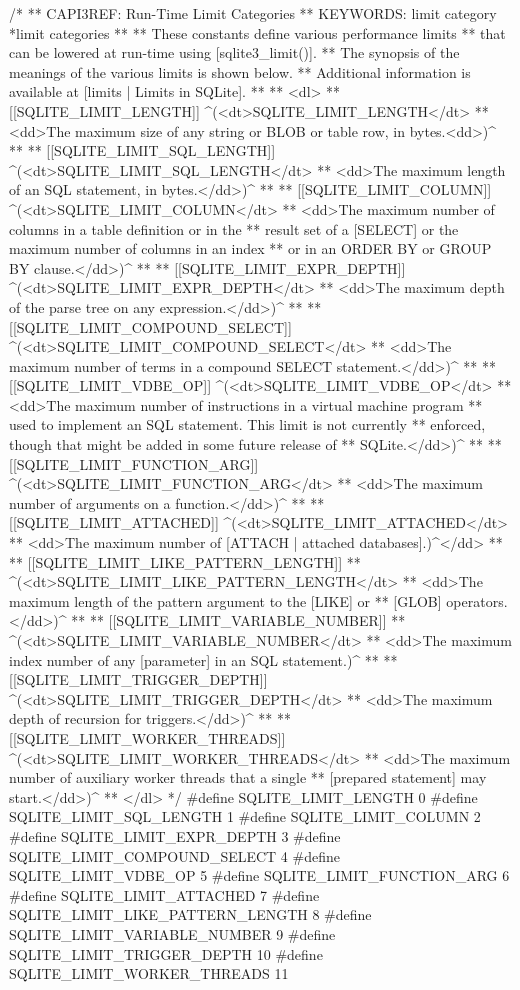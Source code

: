 \begin{Codex}[label=sqlite3.h,numbers=left]
{/*
** CAPI3REF: Run-Time Limit Categories
** KEYWORDS: {limit category} {*limit categories}
**
** These constants define various performance limits
** that can be lowered at run-time using [sqlite3_limit()].
** The synopsis of the meanings of the various limits is shown below.
** Additional information is available at [limits | Limits in SQLite].
**
** <dl>
** [[SQLITE_LIMIT_LENGTH]] ^(<dt>SQLITE_LIMIT_LENGTH</dt>
** <dd>The maximum size of any string or BLOB or table row, in bytes.<dd>)^
**
** [[SQLITE_LIMIT_SQL_LENGTH]] ^(<dt>SQLITE_LIMIT_SQL_LENGTH</dt>
** <dd>The maximum length of an SQL statement, in bytes.</dd>)^
**
** [[SQLITE_LIMIT_COLUMN]] ^(<dt>SQLITE_LIMIT_COLUMN</dt>
** <dd>The maximum number of columns in a table definition or in the
** result set of a [SELECT] or the maximum number of columns in an index
** or in an ORDER BY or GROUP BY clause.</dd>)^
**
** [[SQLITE_LIMIT_EXPR_DEPTH]] ^(<dt>SQLITE_LIMIT_EXPR_DEPTH</dt>
** <dd>The maximum depth of the parse tree on any expression.</dd>)^
**
** [[SQLITE_LIMIT_COMPOUND_SELECT]] ^(<dt>SQLITE_LIMIT_COMPOUND_SELECT</dt>
** <dd>The maximum number of terms in a compound SELECT statement.</dd>)^
**
** [[SQLITE_LIMIT_VDBE_OP]] ^(<dt>SQLITE_LIMIT_VDBE_OP</dt>
** <dd>The maximum number of instructions in a virtual machine program
** used to implement an SQL statement.  This limit is not currently
** enforced, though that might be added in some future release of
** SQLite.</dd>)^
**
** [[SQLITE_LIMIT_FUNCTION_ARG]] ^(<dt>SQLITE_LIMIT_FUNCTION_ARG</dt>
** <dd>The maximum number of arguments on a function.</dd>)^
**
** [[SQLITE_LIMIT_ATTACHED]] ^(<dt>SQLITE_LIMIT_ATTACHED</dt>
** <dd>The maximum number of [ATTACH | attached databases].)^</dd>
**
** [[SQLITE_LIMIT_LIKE_PATTERN_LENGTH]]
** ^(<dt>SQLITE_LIMIT_LIKE_PATTERN_LENGTH</dt>
** <dd>The maximum length of the pattern argument to the [LIKE] or
** [GLOB] operators.</dd>)^
**
** [[SQLITE_LIMIT_VARIABLE_NUMBER]]
** ^(<dt>SQLITE_LIMIT_VARIABLE_NUMBER</dt>
** <dd>The maximum index number of any [parameter] in an SQL statement.)^
**
** [[SQLITE_LIMIT_TRIGGER_DEPTH]] ^(<dt>SQLITE_LIMIT_TRIGGER_DEPTH</dt>
** <dd>The maximum depth of recursion for triggers.</dd>)^
**
** [[SQLITE_LIMIT_WORKER_THREADS]] ^(<dt>SQLITE_LIMIT_WORKER_THREADS</dt>
** <dd>The maximum number of auxiliary worker threads that a single
** [prepared statement] may start.</dd>)^
** </dl>
*/
#define SQLITE_LIMIT_LENGTH                    0
#define SQLITE_LIMIT_SQL_LENGTH                1
#define SQLITE_LIMIT_COLUMN                    2
#define SQLITE_LIMIT_EXPR_DEPTH                3
#define SQLITE_LIMIT_COMPOUND_SELECT           4
#define SQLITE_LIMIT_VDBE_OP                   5
#define SQLITE_LIMIT_FUNCTION_ARG              6
#define SQLITE_LIMIT_ATTACHED                  7
#define SQLITE_LIMIT_LIKE_PATTERN_LENGTH       8
#define SQLITE_LIMIT_VARIABLE_NUMBER           9
#define SQLITE_LIMIT_TRIGGER_DEPTH            10
#define SQLITE_LIMIT_WORKER_THREADS           11

}
\end{Codex}

